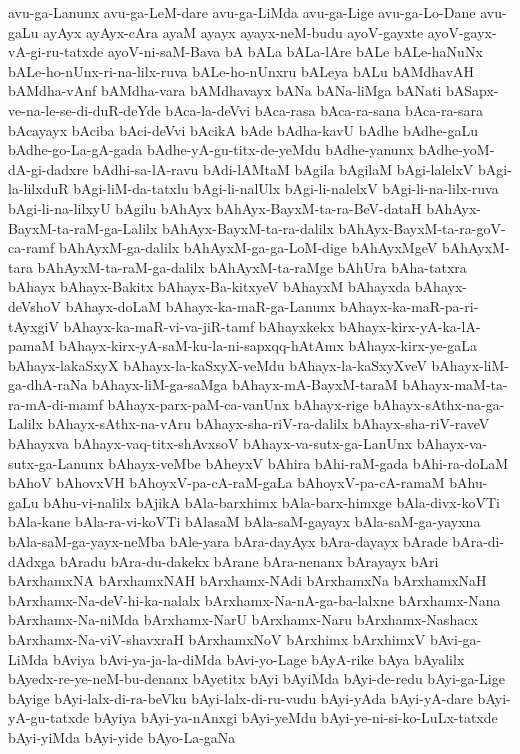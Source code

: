 {avu-ga-Lanunx
avu-ga-LeM-dare
avu-ga-LiMda
avu-ga-Lige
avu-ga-Lo-Dane
avu-gaLu
ayAyx
ayAyx-cAra
ayaM
ayayx
ayayx-neM-budu
ayoV-gayxte
ayoV-gayx-vA-gi-ru-tatxde
ayoV-ni-saM-Bava
bA
bALa
bALa-lAre
bALe
bALe-haNuNx
bALe-ho-nUnx-ri-na-lilx-ruva
bALe-ho-nUnxru
bALeya
bALu
bAMdhavAH
bAMdha-vAnf
bAMdha-vara
bAMdhavayx
bANa
bANa-liMga
bANati
bASapx-ve-na-le-se-di-duR-deYde
bAca-la-deVvi
bAca-rasa
bAca-ra-sana
bAca-ra-sara
bAcayayx
bAciba
bAci-deVvi
bAcikA
bAde
bAdha-kavU
bAdhe
bAdhe-gaLu
bAdhe-go-La-gA-gada
bAdhe-yA-gu-titx-de-yeMdu
bAdhe-yanunx
bAdhe-yoM-dA-gi-dadxre
bAdhi-sa-lA-ravu
bAdi-lAMtaM
bAgila
bAgilaM
bAgi-lalelxV
bAgi-la-lilxduR
bAgi-liM-da-tatxlu
bAgi-li-nalUlx
bAgi-li-nalelxV
bAgi-li-na-lilx-ruva
bAgi-li-na-lilxyU
bAgilu
bAhAyx
bAhAyx-BayxM-ta-ra-BeV-dataH
bAhAyx-BayxM-ta-raM-ga-Lalilx
bAhAyx-BayxM-ta-ra-dalilx
bAhAyx-BayxM-ta-ra-goV-ca-ramf
bAhAyxM-ga-dalilx
bAhAyxM-ga-ga-LoM-dige
bAhAyxMgeV
bAhAyxM-tara
bAhAyxM-ta-raM-ga-dalilx
bAhAyxM-ta-raMge
bAhUra
bAha-tatxra
bAhayx
bAhayx-Bakitx
bAhayx-Ba-kitxyeV
bAhayxM
bAhayxda
bAhayx-deVshoV
bAhayx-doLaM
bAhayx-ka-maR-ga-Lanunx
bAhayx-ka-maR-pa-ri-tAyxgiV
bAhayx-ka-maR-vi-va-jiR-tamf
bAhayxkekx
bAhayx-kirx-yA-ka-lA-pamaM
bAhayx-kirx-yA-saM-ku-la-ni-sapxqq-hAtAmx
bAhayx-kirx-ye-gaLa
bAhayx-lakaSxyX
bAhayx-la-kaSxyX-veMdu
bAhayx-la-kaSxyXveV
bAhayx-liM-ga-dhA-raNa
bAhayx-liM-ga-saMga
bAhayx-mA-BayxM-taraM
bAhayx-maM-ta-ra-mA-di-mamf
bAhayx-parx-paM-ca-vanUnx
bAhayx-rige
bAhayx-sAthx-na-ga-Lalilx
bAhayx-sAthx-na-vAru
bAhayx-sha-riV-ra-dalilx
bAhayx-sha-riV-raveV
bAhayxva
bAhayx-vaq-titx-shAvxsoV
bAhayx-va-sutx-ga-LanUnx
bAhayx-va-sutx-ga-Lanunx
bAhayx-veMbe
bAheyxV
bAhira
bAhi-raM-gada
bAhi-ra-doLaM
bAhoV
bAhovxVH
bAhoyxV-pa-cA-raM-gaLa
bAhoyxV-pa-cA-ramaM
bAhu-gaLu
bAhu-vi-nalilx
bAjikA
bAla-barxhimx
bAla-barx-himxge
bAla-divx-koVTi
bAla-kane
bAla-ra-vi-koVTi
bAlasaM
bAla-saM-gayayx
bAla-saM-ga-yayxna
bAla-saM-ga-yayx-neMba
bAle-yara
bAra-dayAyx
bAra-dayayx
bArade
bAra-di-dAdxga
bAradu
bAra-du-dakekx
bArane
bAra-nenanx
bArayayx
bAri
bArxhamxNA
bArxhamxNAH
bArxhamx-NAdi
bArxhamxNa
bArxhamxNaH
bArxhamx-Na-deV-hi-ka-nalalx
bArxhamx-Na-nA-ga-ba-lalxne
bArxhamx-Nana
bArxhamx-Na-niMda
bArxhamx-NarU
bArxhamx-Naru
bArxhamx-Nashacx
bArxhamx-Na-viV-shavxraH
bArxhamxNoV
bArxhimx
bArxhimxV
bAvi-ga-LiMda
bAviya
bAvi-ya-ja-la-diMda
bAvi-yo-Lage
bAyA-rike
bAya
bAyalilx
bAyedx-re-ye-neM-bu-denanx
bAyetitx
bAyi
bAyiMda
bAyi-de-redu
bAyi-ga-Lige
bAyige
bAyi-lalx-di-ra-beVku
bAyi-lalx-di-ru-vudu
bAyi-yAda
bAyi-yA-dare
bAyi-yA-gu-tatxde
bAyiya
bAyi-ya-nAnxgi
bAyi-yeMdu
bAyi-ye-ni-si-ko-LuLx-tatxde
bAyi-yiMda
bAyi-yide
bAyo-La-gaNa
}
